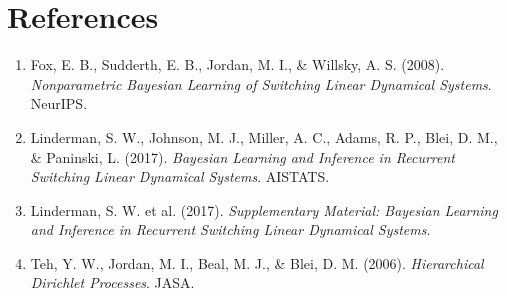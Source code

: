 \documentclass[11pt]{article}
\begin{document}
\section*{References}
\begin{enumerate}[leftmargin=1.5em]
    \item Fox, E. B., Sudderth, E. B., Jordan, M. I., \& Willsky, A. S. (2008). \emph{Nonparametric Bayesian Learning of Switching Linear Dynamical Systems}. NeurIPS.
    \item Linderman, S. W., Johnson, M. J., Miller, A. C., Adams, R. P., Blei, D. M., \& Paninski, L. (2017). \emph{Bayesian Learning and Inference in Recurrent Switching Linear Dynamical Systems}. AISTATS.
    \item Linderman, S. W. et al. (2017). \emph{Supplementary Material: Bayesian Learning and Inference in Recurrent Switching Linear Dynamical Systems}.
    \item Teh, Y. W., Jordan, M. I., Beal, M. J., \& Blei, D. M. (2006). \emph{Hierarchical Dirichlet Processes}. JASA.
\end{enumerate}
\end{document}
